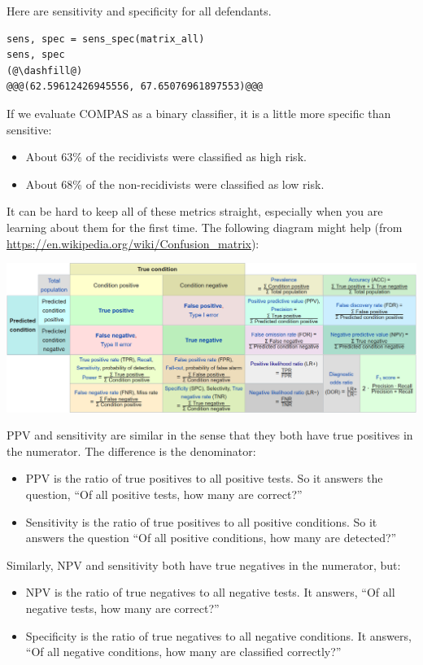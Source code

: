 Here are sensitivity and specificity for all defendants.

\begin{lstlisting}[]
sens, spec = sens_spec(matrix_all)
sens, spec
(@\dashfill@)
@@@(62.59612426945556, 67.65076961897553)@@@
\end{lstlisting}

If we evaluate COMPAS as a binary classifier, it is a little more
specific than sensitive:

\begin{itemize}
\item
  About 63\% of the recidivists were classified as high risk.
\item
  About 68\% of the non-recidivists were classified as low risk.
\end{itemize}

It can be hard to keep all of these metrics straight, especially when
you are learning about them for the first time. The following diagram
might help (from \url{https://en.wikipedia.org/wiki/Confusion_matrix}):

\includegraphics{figs/confusion_matrix2.png}

PPV and sensitivity are similar in the sense that they both have true
positives in the numerator. The difference is the denominator:

\begin{itemize}
\item
  PPV is the ratio of true positives to all positive tests. So it
  answers the question, ``Of all positive tests, how many are correct?''
\item
  Sensitivity is the ratio of true positives to all positive conditions.
  So it answers the question ``Of all positive conditions, how many are
  detected?''
\end{itemize}

Similarly, NPV and sensitivity both have true negatives in the
numerator, but:

\begin{itemize}
\item
  NPV is the ratio of true negatives to all negative tests. It answers,
  ``Of all negative tests, how many are correct?''
\item
  Specificity is the ratio of true negatives to all negative conditions.
  It answers, ``Of all negative conditions, how many are classified
  correctly?''
\end{itemize}

